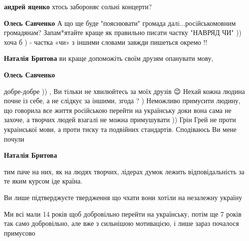 \begin{itemize}
\begin{itemize}
\textbf{андрей яценко} хтось забороняє сольні концерти?

 
\textbf{Олесь Савченко} А що ще буде "пояснювати" громада далi...росiйськомовним громадянам? Запам*ятайте краще як правильно писати частку "НАВРЯД ЧИ" )) хоча б ) - частка «чи» з іншими словами завжди пишеться окремо !!

 
\textbf{Наталія Бритова} ви краще допоможіть своїм друзям опанувати мову,

 
\textbf{Олесь Савченко} 

добре-добре )) , Ви тільки не хвилюйтесь за моїх друзів 😉 Нехай кожна людина
почне із себе, а не слідкує за іншими, згода ? ) Неможливо примусити людину, що
говорила все життя російською перейти на українську доки вона сама не захоче, а
творчих людей взагалі не можна примушувати )) Грін Грей не проти украінської
мови, а проти тиску та подвійних стандартів. Сподіваюсь Ви мене почули \Smiley[1.0][yellow]


 
\textbf{Наталія Бритова} 

тим паче на них, як на людях творчих, лідерах думок лежить відповідальність за
те яким курсом іде країна.

Ви лише підтверджуєте твердження що чхати вони хотіли на незалежну україну

Ми всі мали 14 років щоб добровільно перейти на українську, потім ще 7 років
так само добровільно, але вже з сильнішою мотивацією, і лише зараз почалося
примусово


\end{itemize}
\end{itemize}

